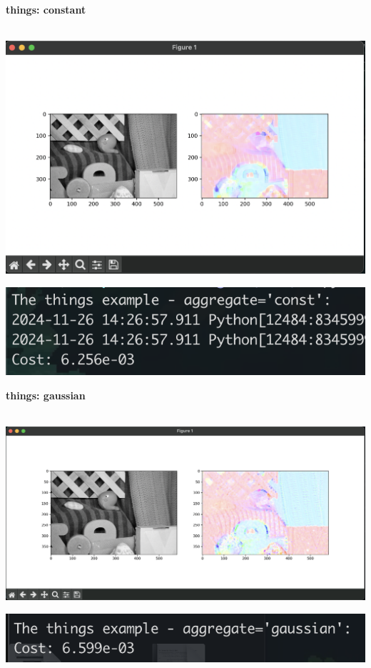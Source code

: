 \documentclass[12pt]{article}
\begin{document}
\textbf{things: constant}  \\ \\
\begin{minipage}{0.49\textwidth}
    \centering
    \includegraphics[width=\textwidth]{./problem2_flow/things_constant_image.png}
\end{minipage}
\hfill
\begin{minipage}{0.49\textwidth}
    \centering
    \includegraphics[width=\textwidth]{./problem2_flow/things_constant_result.png}
\end{minipage}

\vspace{1em}

\textbf{things: gaussian} \\ \\
\begin{minipage}{0.49\textwidth}
    \centering
    \includegraphics[width=\textwidth]{./problem2_flow/things_gaussian_image.png}
\end{minipage}
\hfill
\begin{minipage}{0.49\textwidth}
    \centering
    \includegraphics[width=\textwidth]{./problem2_flow/things_gaussian_result.png}
\end{minipage}
\end{document}

